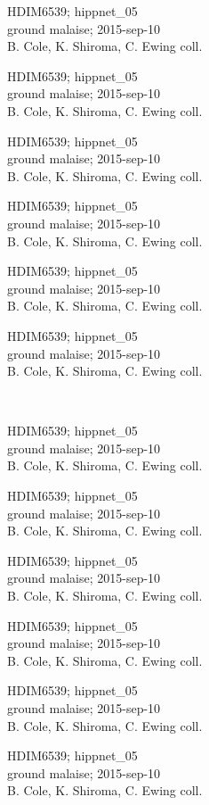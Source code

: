 \documentclass[2pt]{extarticle}
\begin{document}
\noindent
\parbox{0.16\textwidth}{\tiny \raggedright \rule[-0.3\baselineskip]{0pt}{10pt}HDIM6539; hippnet\_05\\ ground malaise; 2015-sep-10\\ B. Cole, K. Shiroma, C. Ewing coll.}
\parbox{0.16\textwidth}{\tiny \raggedright \rule[-0.3\baselineskip]{0pt}{10pt}HDIM6539; hippnet\_05\\ ground malaise; 2015-sep-10\\ B. Cole, K. Shiroma, C. Ewing coll.}
\parbox{0.16\textwidth}{\tiny \raggedright \rule[-0.3\baselineskip]{0pt}{10pt}HDIM6539; hippnet\_05\\ ground malaise; 2015-sep-10\\ B. Cole, K. Shiroma, C. Ewing coll.}
\parbox{0.16\textwidth}{\tiny \raggedright \rule[-0.3\baselineskip]{0pt}{10pt}HDIM6539; hippnet\_05\\ ground malaise; 2015-sep-10\\ B. Cole, K. Shiroma, C. Ewing coll.}
\parbox{0.16\textwidth}{\tiny \raggedright \rule[-0.3\baselineskip]{0pt}{10pt}HDIM6539; hippnet\_05\\ ground malaise; 2015-sep-10\\ B. Cole, K. Shiroma, C. Ewing coll.}
\parbox{0.16\textwidth}{\tiny \raggedright \rule[-0.3\baselineskip]{0pt}{10pt}HDIM6539; hippnet\_05\\ ground malaise; 2015-sep-10\\ B. Cole, K. Shiroma, C. Ewing coll.} \\ 
\vspace{0.001in} 

\noindent
\parbox{0.16\textwidth}{\tiny \raggedright \rule[-0.3\baselineskip]{0pt}{10pt}HDIM6539; hippnet\_05\\ ground malaise; 2015-sep-10\\ B. Cole, K. Shiroma, C. Ewing coll.}
\parbox{0.16\textwidth}{\tiny \raggedright \rule[-0.3\baselineskip]{0pt}{10pt}HDIM6539; hippnet\_05\\ ground malaise; 2015-sep-10\\ B. Cole, K. Shiroma, C. Ewing coll.}
\parbox{0.16\textwidth}{\tiny \raggedright \rule[-0.3\baselineskip]{0pt}{10pt}HDIM6539; hippnet\_05\\ ground malaise; 2015-sep-10\\ B. Cole, K. Shiroma, C. Ewing coll.}
\parbox{0.16\textwidth}{\tiny \raggedright \rule[-0.3\baselineskip]{0pt}{10pt}HDIM6539; hippnet\_05\\ ground malaise; 2015-sep-10\\ B. Cole, K. Shiroma, C. Ewing coll.}
\parbox{0.16\textwidth}{\tiny \raggedright \rule[-0.3\baselineskip]{0pt}{10pt}HDIM6539; hippnet\_05\\ ground malaise; 2015-sep-10\\ B. Cole, K. Shiroma, C. Ewing coll.}
\parbox{0.16\textwidth}{\tiny \raggedright \rule[-0.3\baselineskip]{0pt}{10pt}HDIM6539; hippnet\_05\\ ground malaise; 2015-sep-10\\ B. Cole, K. Shiroma, C. Ewing coll.} \\ 
\vspace{0.001in} 
\end{document}
